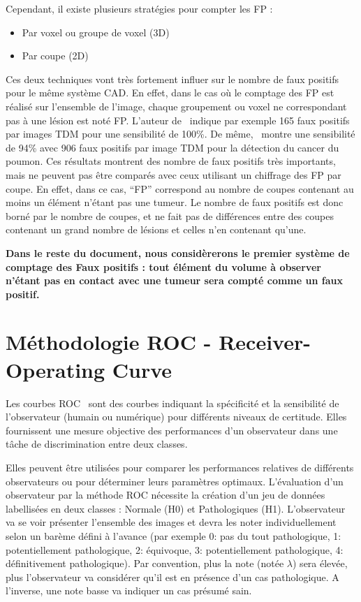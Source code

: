 Cependant, il existe plusieurs stratégies pour compter les FP :
\begin{itemize}
 \item Par voxel ou groupe de voxel (3D)
 \item Par coupe (2D)
\end{itemize}

Ces deux techniques vont très fortement influer sur le nombre de faux positifs pour le même système CAD. En effet, dans le cas où le comptage des FP est réalisé sur l'ensemble de l'image, chaque groupement ou voxel ne correspondant pas à une lésion est noté FP. L'auteur de~\cite{paik2004surface} indique par exemple 165 faux positifs par images TDM pour une sensibilité de 100\%. De même,~\cite{zhao2003automatic} montre une sensibilité de 94\% avec 906 faux positifs par image TDM pour la détection du cancer du poumon. Ces résultats montrent des nombre de faux positifs très importants, mais ne peuvent pas être comparés avec ceux utilisant un chiffrage des FP par coupe. En effet, dans ce cas, ``FP'' correspond au nombre de coupes contenant au moins un élément n'étant pas une tumeur. Le nombre de faux positifs est donc borné par le nombre de coupes, et ne fait pas de différences entre des coupes contenant un grand nombre de lésions et celles n'en contenant qu'une. 

\textbf{Dans le reste du document, nous considèrerons le premier système de comptage des Faux positifs : tout élément du volume à observer n'étant pas en contact avec une tumeur sera compté comme un faux positif.}


	\section{Méthodologie ROC - Receiver-Operating Curve}

Les courbes ROC~\cite{swets1982evaluation,metz1986roc} sont des courbes indiquant la spécificité et la sensibilité de l'observateur (humain ou numérique) pour différents niveaux de certitude. Elles fournissent une mesure objective des performances d'un observateur dans une tâche de discrimination entre deux classes. 

Elles peuvent être utilisées pour comparer les performances relatives de différents observateurs ou pour déterminer leurs paramètres optimaux. L’évaluation d'un observateur par la méthode ROC nécessite la création d'un jeu de données labellisées en deux classes : Normale (H0) et Pathologiques (H1). L'observateur va se voir présenter l'ensemble des images et devra les noter individuellement selon un barème défini à l'avance (par exemple 0: pas du tout pathologique, 1: potentiellement pathologique, 2: équivoque, 3: potentiellement pathologique, 4: définitivement pathologique). Par convention, plus la note (notée $\lambda$) sera élevée, plus l'observateur va considérer qu'il est en présence d'un cas pathologique. A l'inverse, une note basse va indiquer un cas présumé sain. 


